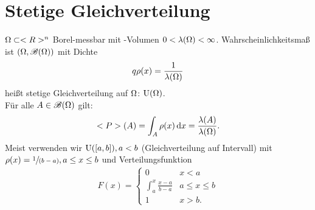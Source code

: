 \section{Stetige Gleichverteilung}
\begin{*erinnerung}
	$\Omega \subset <R>^n$ Borel-messbar mit -Volumen $0 < \lambda(\Omega) < \infty$. Wahrscheinlichkeitsmaß ist $(\Omega, \mathscr{B}(\Omega))$ mit Dichte
	\begin{align*}
	q\rho(x) = \frac{1}{\lambda(\Omega)}
	\end{align*}
	heißt stetige Gleichverteilung auf $\Omega$: $\operatorname{U}(\Omega)$.\\
	Für alle $A \in \mathscr{B}(\Omega)$ gilt:
	\begin{align*}
		<P>(A) = \int_{A} \rho(x) \,\mathrm{d} x = \frac{\lambda(A)}{\lambda(\Omega)}.
	\end{align*}
	Meist verwenden wir $\operatorname{U}([a,b]), a < b$ (Gleichverteilung auf Intervall) mit $\rho(x) = \sfrac{1}{(b-a)}, a \le x \le b$ und Verteilungsfunktion
	\begin{align*}
		F(x) = 
		\begin{cases}
			0 & x < a\\
			\int_{a}^{x} \frac{x-a}{b-a} & a \le x \le b\\
			1 & x >b.
		\end{cases}
	\end{align*}
\end{*erinnerung}
